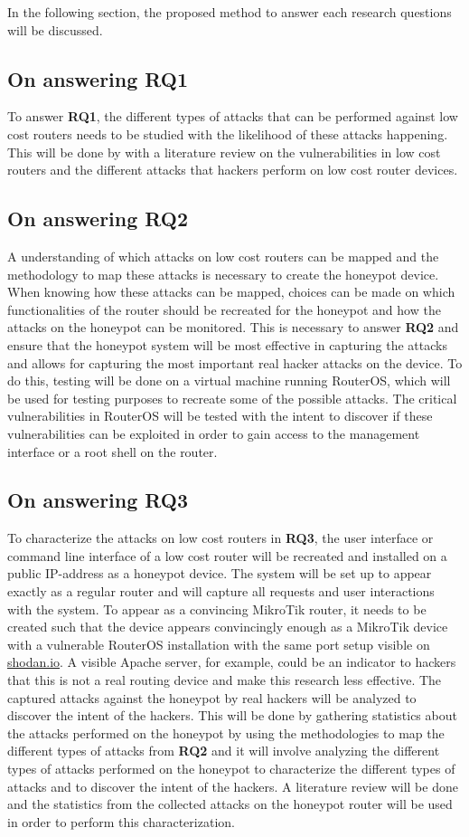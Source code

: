 In the following section, the proposed method to answer each research questions will be discussed.

\subsection{On answering RQ1}
To answer \textbf{RQ1}, the different types of attacks that can be performed against low cost routers needs to be studied with the likelihood of these attacks happening. This will be done by with a literature review on the vulnerabilities in low cost routers and the different attacks that hackers perform on low cost router devices.

\subsection{On answering RQ2}
A understanding of which attacks on low cost routers can be mapped and the methodology to map these attacks is necessary to create the honeypot device. When knowing how these attacks can be mapped, choices can be made on which functionalities of the router should be recreated for the honeypot and how the attacks on the honeypot can be monitored. This is necessary to answer \textbf{RQ2} and ensure that the honeypot system will be most effective in capturing the attacks and allows for capturing the most important real hacker attacks on the device. To do this, testing will be done on a virtual machine running RouterOS, which will be used for testing purposes to recreate some of the possible attacks. The critical vulnerabilities in RouterOS will be tested with the intent to discover if these vulnerabilities can be exploited in order to gain access to the management interface or a root shell on the router.

\subsection{On answering RQ3}
To characterize the attacks on low cost routers in \textbf{RQ3}, the user interface or command line interface of a low cost router will be recreated and installed on a public IP-address as a honeypot device. The system will be set up to appear exactly as a regular router and will capture all requests and user interactions with the system. To appear as a convincing MikroTik router, it needs to be created such that the device appears convincingly enough as a MikroTik device with a vulnerable RouterOS installation with the same port setup visible on \url{shodan.io}. A visible Apache server, for example, could be an indicator to hackers that this is not a real routing device and make this research less effective. The captured attacks against the honeypot by real hackers will be analyzed to discover the intent of the hackers. This will be done by gathering statistics about the attacks performed on the honeypot by using the methodologies to map the different types of attacks from \textbf{RQ2} and it will involve analyzing the different types of attacks performed on the honeypot to characterize the different types of attacks and to discover the intent of the hackers. A literature review will be done and the statistics from the collected attacks on the honeypot router will be used in order to perform this characterization.